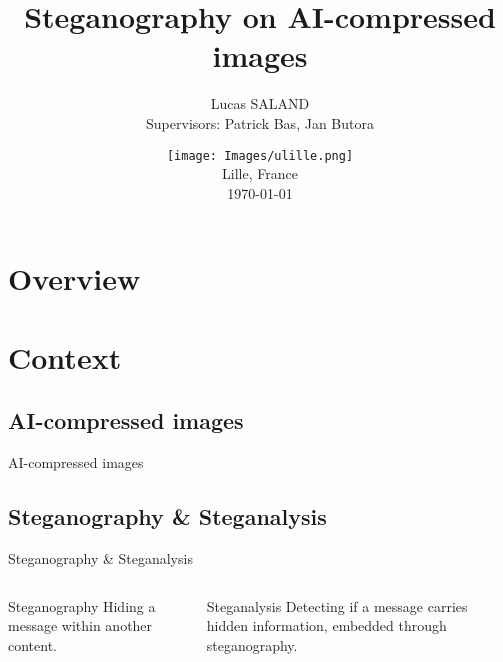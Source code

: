 \documentclass[11pt,compress]{beamer} %
\begin{document}
\title[]{Steganography on AI-compressed images}
\author{Lucas SALAND\\ Supervisors: Patrick Bas, Jan Butora}
\date[\today]{\texttt{[image: Images/ulille.png]} \medskip \\ Lille, France \medskip \\ \today}

\frame{\titlepage}

\section*{Overview}
\begin{frame}
  \tableofcontents
\end{frame}

\section{Context}
\subsection{AI-compressed images}
\begin{frame}{AI-compressed images}
\end{frame}

\subsection{Steganography \& Steganalysis}

\begin{frame}{Steganography \& Steganalysis}
  \begin{columns}
    \begin{column}{0.4\textwidth}
      \begin{block}{Steganography}
        Hiding a message within another content.
      \end{block}
    \end{column}
    \begin{column}{0.45\textwidth}
      \begin{block}{Steganalysis}
        Detecting if a message carries hidden information, embedded through steganography.
      \end{block}
    \end{column}
  \end{columns}
\end{frame}
\end{document}
